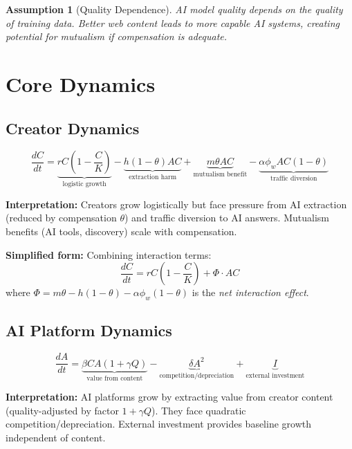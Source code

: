 \documentclass[11pt,a4paper]{article}
\newtheorem{assumption}{Assumption}
\begin{document}
\begin{assumption}[Quality Dependence]
AI model quality depends on the quality of training data. Better web content leads to more capable AI systems, creating potential for mutualism if compensation is adequate.
\end{assumption}

\section{Core Dynamics}

\subsection{Creator Dynamics}

\begin{equation}
\boxed{
\frac{dC}{dt} = \underbrace{rC\left(1 - \frac{C}{K}\right)}_{\text{logistic growth}} - \underbrace{h(1-\theta)AC}_{\text{extraction harm}} + \underbrace{m\theta AC}_{\text{mutualism benefit}} - \underbrace{\alpha\phi_w AC(1-\theta)}_{\text{traffic diversion}}
}
\end{equation}

\textbf{Interpretation:} Creators grow logistically but face pressure from AI extraction (reduced by compensation $\theta$) and traffic diversion to AI answers. Mutualism benefits (AI tools, discovery) scale with compensation.

\textbf{Simplified form:} Combining interaction terms:
\begin{equation}
\frac{dC}{dt} = rC\left(1 - \frac{C}{K}\right) + \Phi \cdot AC
\end{equation}
where $\Phi = m\theta - h(1-\theta) - \alpha\phi_w(1-\theta)$ is the \textit{net interaction effect}.

\subsection{AI Platform Dynamics}

\begin{equation}
\boxed{
\frac{dA}{dt} = \underbrace{\beta CA(1 + \gamma Q)}_{\text{value from content}} - \underbrace{\delta A^2}_{\text{competition/depreciation}} + \underbrace{I}_{\text{external investment}}
}
\end{equation}

\textbf{Interpretation:} AI platforms grow by extracting value from creator content (quality-adjusted by factor $1+\gamma Q$). They face quadratic competition/depreciation. External investment provides baseline growth independent of content.
\end{document}
